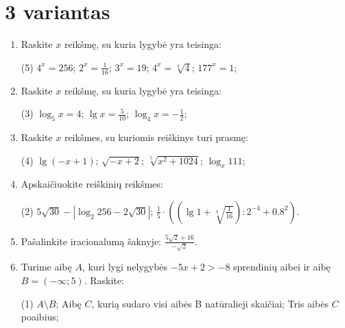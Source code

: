 \documentclass[a4paper]{article}
\begin{document}
\section*{3 variantas}

\begin{enumerate}
      \item Raskite $x$ reikšmę, su kuria lygybė yra teisinga:

            \begin{tasks}[item-format={\normalfont}, after-item-skip=4mm](5)
                  \task $4^{x}=256$;
                  \task $2^{x}=\frac{1}{16}$;
                  \task $3^{x}=19$;
                  \task $4^{x}=\sqrt[3]{4}$;
                  \task $177^{x}=1$;
            \end{tasks}

      \item Raskite $x$ reikšmę, su kuria lygybė yra teisinga:
            \begin{tasks}[item-format={\normalfont}, after-item-skip=4mm](3)
                  \task $\log_{5} x=4$;
                  \task $\lg x=\frac{5}{10}$;
                  \task $\log_{4} x=-\frac{1}{2}$;
            \end{tasks}

      \item Raskite $x$ reikšmes, su kuriomis reiškinys turi prasmę:
            \begin{tasks}[item-format={\normalfont}, after-item-skip=4mm](4)
                  \task $\lg (-x+1)$;
                  \task $\sqrt{-x+2}$;
                  \task $\sqrt[5]{x^{2}+1024}$;
                  \task $\log_{x}111$;
            \end{tasks}

      \item Apskaičiuokite reiškinių reikšmes:
            \begin{tasks}[item-format={\normalfont}, after-item-skip=10mm](2)
                  \task $5\sqrt{30}-\left|\log_{2}256-2\sqrt{30}\right|$;
                  \task $\frac{1}{5} \cdot
                        ((\lg1+\sqrt[4]{\frac{1}{16}}):2^{-4}+0.8^2)$.
            \end{tasks}
      \item Pašalinkite iracionalumą šaknyje: $\frac{5\sqrt{2}+16}{-\sqrt{2}}$.
      \item Turime aibę $A$, kuri lygi nelygybės $-5x+2>-8$ sprendinių aibei ir
            aibę $B=(-\infty;5)$. Raskite:
            \begin{tasks}[item-format={\normalfont}, after-item-skip=2mm](1)
                  \task $A \setminus B$;
                  \task Aibę $C$, kurią sudaro visi aibės B natūralieji
                  skaičiai;
                  \task Tris aibės $C$ poaibius;
            \end{tasks}

\end{enumerate}
\end{document}
